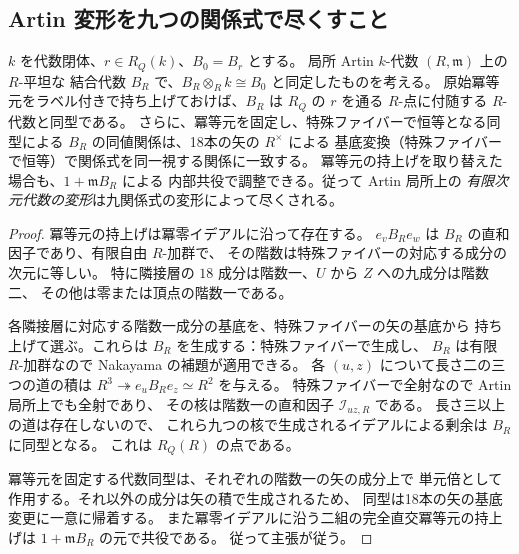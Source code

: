 \subsection{Artin 変形を九つの関係式で尽くすこと}
\begin{theorem}[関係式の形式的完備性]
\label{thm:aou-relation-formal-completeness}
$k$ を代数閉体、$r\in R_Q(k)$、$B_0=B_r$ とする。
局所 Artin $k$-代数 $(R,\mathfrak m)$ 上の $R$-平坦な
結合代数 $B_R$ で、$B_R\otimes_Rk\cong B_0$ と同定したものを考える。
原始冪等元をラベル付きで持ち上げておけば、$B_R$ は
$R_Q$ の $r$ を通る $R$-点に付随する $R$-代数と同型である。
さらに、冪等元を固定し、特殊ファイバーで恒等となる同型による
$B_R$ の同値関係は、18本の矢の $R^\times$ による
基底変換（特殊ファイバーで恒等）で関係式を同一視する関係に一致する。
冪等元の持上げを取り替えた場合も、$1+\mathfrak mB_R$ による
内部共役で調整できる。従って Artin 局所上の
\emph{有限次元代数の変形}は九関係式の変形によって尽くされる。
\end{theorem}
\begin{proof}
冪等元の持上げは冪零イデアルに沿って存在する。
$e_vB_Re_w$ は $B_R$ の直和因子であり、有限自由 $R$-加群で、
その階数は特殊ファイバーの対応する成分の次元に等しい。
特に隣接層の $18$ 成分は階数一、$U$ から $Z$ への九成分は階数二、
その他は零または頂点の階数一である。

各隣接層に対応する階数一成分の基底を、特殊ファイバーの矢の基底から
持ち上げて選ぶ。これらは $B_R$ を生成する：特殊ファイバーで生成し、
$B_R$ は有限 $R$-加群なので Nakayama の補題が適用できる。
各 $(u,z)$ について長さ二の三つの道の積は
$R^3\twoheadrightarrow e_uB_Re_z\simeq R^2$ を与える。
特殊ファイバーで全射なので Artin 局所上でも全射であり、
その核は階数一の直和因子 $\mathscr I_{uz,R}$ である。
長さ三以上の道は存在しないので、
これら九つの核で生成されるイデアルによる剰余は $B_R$ に同型となる。
これは $R_Q(R)$ の点である。

冪等元を固定する代数同型は、それぞれの階数一の矢の成分上で
単元倍として作用する。それ以外の成分は矢の積で生成されるため、
同型は18本の矢の基底変更に一意に帰着する。
また冪零イデアルに沿う二組の完全直交冪等元の持上げは
$1+\mathfrak mB_R$ の元で共役である。
従って主張が従う。
\end{proof}

